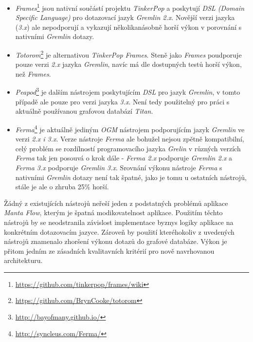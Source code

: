 \begin{itemize}
	\item{\textit{Frames}}\footnote{\url{https://github.com/tinkerpop/frames/wiki}} jsou nativní součástí projektu \textit{TinkerPop} a poskytují \textit{DSL (Domain Specific Language)} pro dotazovací jazyk \textit{Gremlin 2.x}. Novější verzi jazyka (\textit{3.x}) ale nepodporují a vykazují několikanásobně horší výkon v porovnání s nativními \textit{Gremlin} dotazy.

	\item{\textit{Totorom}}\footnote{\url{https://github.com/BrynCooke/totorom}} je alternativou \textit{TinkerPop Frames}. Steně jako \textit{Frames} poudporuje pouze verzi \textit{2.x} jazyka \textit{Gremlin}, navíc má dle dostupných testů horší výkon, než \textit{Frames}.

	\item{\textit{Peapod}}\footnote{\url{http://bayofmany.github.io/}} je dalším nástrojem poskytujícím \textit{DSL} pro jazyk \textit{Gremlin}, v tomto případě ale pouze pro verzi jazyka \textit{3.x}. Není tedy použitelný pro práci s aktuálně používanou grafovou databází \textit{Titan}.

	\item{\textit{Ferma}}\footnote{\url{http://syncleus.com/Ferma/}} je aktuálně jediným \textit{OGM} nástrojem podporujícím jazyk \textit{Gremlin} ve verzi \textit{2.x i 3.x}. Verze nástroje \textit{Ferma} ale bohužel nejsou zpětně kompatibilní, celý problém se rozdílností programovacího jazyka \textit{Grelin} v různých verzích \textit{Ferma} tak jen posouvá o krok dále - \textit{Ferma 2.x} podporuje \textit{Gremlin 2.x} a \textit{Ferma 3.x} podporuje \textit{Gremlin 3.x}. Srovnání výkonu nástroje \textit{Ferma} s nativními \textit{Gremlin} dotazy není tak špatné, jako je tomu u ostatních nástrojů, stále je ale o zhruba 25\% horší.
\end{itemize}

Žádný z existujících nástrojů neřeší jeden z podstatných problémů aplikace \textit{Manta Flow}, kterým je špatná modikovatelnost aplikace. Použitím těchto nástrojů by se neodstranila závislost implementace byznys logiky aplikace na konkrétním dotazovacím jazyce. Zároveň by použití kteréhokoliv z uvedených nástrojů znamenalo zhoršení výkonu dotazů do grafové databáze. Výkon je přitom jedním ze zásadních kvalitavních kritérií pro nově navrhovanou architekturu.

